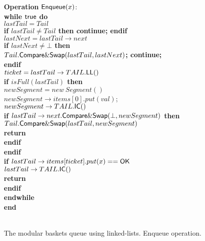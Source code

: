 \begin{figure}[H]
{{\begin{minipage}[t]{180mm}
\begin{tabbing}
{\bf Operation} ${\sf Enqueue}(x)$: \\
 \> {\bf while \({\sf true}\) do}\\
 \>\> $lastTail = Tail$ \\
 \>\> {\bf if $lastTail \ne Tail$ then continue; endif} \\
 \>\> $lastNext = lastTail\rightarrow next$ \\
 \>\> {\bf if \(lastNext \ne \bot\) then}\\
 \>\>\> {\bf \(Tail.{\sf Compare\&Swap}(lastTail, lastNext)\); continue;} \\
 \>\> {\bf endif}\\
 \>\> {\bf \(ticket = lastTail\rightarrow TAIL.{\sf LL}()\)} \\
 \>\> {\bf if \(isFull(lastTail)\) then} \\
 \>\>\> {\bf \(newSegment = new\ Segment()\)} \\
 \>\>\> {\bf \(newSegment\rightarrow{}items[0].put(val)\)};\\
 \>\>\> {\bf \(newSegment\rightarrow{}TAIL.{\sf IC}()\)}\\
 \>\>\> {\bf if \(lastTail\rightarrow{}next.{\sf Compare\&Swap}(\bot, newSegment)\) then}\\
 \>\>\>\> \(Tail.{\sf Compare\&Swap}(lastTail, newSegment)\)\\
 \>\>\>\> {\bf return \ok}\\
 \>\>\> {\bf endif}\\
 \>\> {\bf endif}\\
 \>\> {\bf if \(lastTail\rightarrow{}items[ticket].put(x) == {\sf OK}\)} \\
 \>\>\> \(lastTail\rightarrow{}TAIL.{\sf IC}()\) \\
 \>\>\> {\bf return \ok} \\
 \>\> {\bf endif} \\
 \> {\bf endwhile}\\
{\bf end \Enq} \\ \\

\end{tabbing}
\end{minipage} }
\caption{\label{alg:basket-queue-linked-list-enq}The modular baskets queue using linked-lists. Enqueue operation.}
}
\end{figure}

